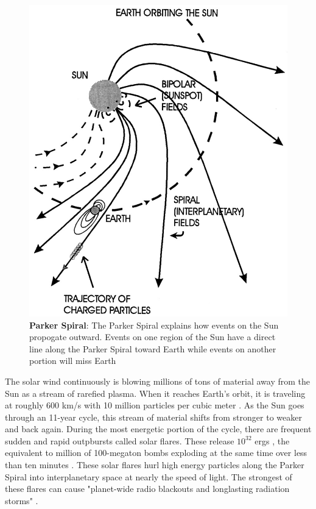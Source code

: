 \documentclass[twoside]{report}
\begin{document}
\begin{figure}[ht]
  \begin{center}
    \includegraphics[scale=0.6]{parkerspiral}
    \caption{{\bf Parker Spiral}: The Parker Spiral explains how events on the Sun propogate outward. Events on one region of the Sun have a direct line along the Parker Spiral toward Earth while events on another portion will miss Earth \cite{spiralimage}}
    \label{fig:parkerspiral}
 \end{center}
\end{figure}

The solar wind continuously is blowing millions of tons of material away from the Sun as a stream of rarefied plasma. When it reaches Earth's orbit, it is traveling at roughly 600 km/s  with 10 million particles per cubic meter \cite[p. 67]{langbook}. As the Sun goes through an 11-year cycle, this stream of material shifts from stronger to weaker and back again. During the most energetic portion of the cycle, there are frequent sudden and rapid outpbursts called solar flares. These release $10^{32}$ ergs \cite{solarenergy}, the equivalent to million of 100-megaton bombs exploding at the same time over less than ten minutes \cite[p. 89]{langbook}. These solar flares hurl high energy particles along the Parker Spiral into interplanetary space at nearly the speed of light. The strongest of these flares can cause "planet-wide radio blackouts and longlasting radiation storms" \cite[p. 255]{langbook}. 
\end{document}
